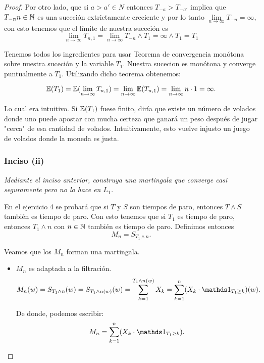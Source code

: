 \begin{proof}
		Por otro lado, que si $a>a' \in N$ entonces $T_{-a} > T_{-a'}$ implica que $T_{-n} n \in \mathbb{N}$ es 
		una suceción extrictamente creciente y por lo tanto 
		$\lim\limits_{n \rightarrow \infty} T_{-n} = \infty$, con esto tenemos que el límite de nuestra 
		suceción es 
		$$		
		\lim_{n\rightarrow\infty} T_{n,1} = 
		\lim_{n\rightarrow\infty} T_{-n} \wedge T_1 = 
		\infty \wedge T_1 = 
		T_1
		$$

		Tenemos todos los ingredientes para usar Teorema de convergencia monótona sobre nuestra suceción
		y la variable $T_1$. Nuestra sucecion es monótona y converge puntualmente a $T_1$. Utilizando
		dicho teorema obtenemos:
		
		$$
		\mathbb{E}(T_1) = 
		\mathbb{E}(\lim_{n\rightarrow\infty} T_{n,1}) = 
		\lim_{n\rightarrow\infty} \mathbb{E}(T_{n,1}) = 
		\lim_{n\rightarrow\infty} n\cdot 1 =
		\infty.
		$$
		
		Lo cual era intuitivo. Si $\mathbb{E}(T_1)$ fuese finito, diría que existe un número de volados donde
		uno puede apostar con mucha certeza que ganará un peso después de jugar "cerca" de esa cantidad
		de volados. Intuitivamente, esto vuelve injusto un juego de volados donde la moneda es
		justa.\\
		
	\subsubsection{Inciso (ii)}
	\emph
	{	
		Mediante el inciso anterior, construya una martingala que converge 
		casi seguramente pero no lo hace en $L_1$.\\
	}
		
		En el ejercicio 4 se probará que si $T$ y $S$ son tiempos de paro, entonces $T\wedge S$ también 
		es tiempo de paro. Con esto tenemos que si $T_1$ es tiempo de paro, entonces $T_1 \wedge n$ con 
		$n \in \mathbb{N}$ también es tiempo de paro. Definimos entonces 
		$$M_n = S_{T_1 \wedge n}.$$
		
		Veamos que los $M_n$ forman una martingala.
		
		\begin{itemize}
			\item 
				$M_n$ es adaptada a la filtración.
				\begin{align}
					M_n(w) = S_{T_1 \wedge n}(w) = 
					S_{T_1 \wedge n (w)}(w) = 
					\sum_{k=1}^{T_1 \wedge n (w)} X_k = 
					\sum_{k=1}^{n} (X_k \cdot \indic_{T_1 \geq k})(w).
				\end{align}
				
				De donde, podemos escribir:
				\begin{align}\label{problema1_3:descomposicion_de_M_n}
					M_n = \sum_{k=1}^{n} (X_k \cdot \indic_{T_1 \geq k}).
				\end{align}								 		
				

\end{itemize}
\end{proof}
